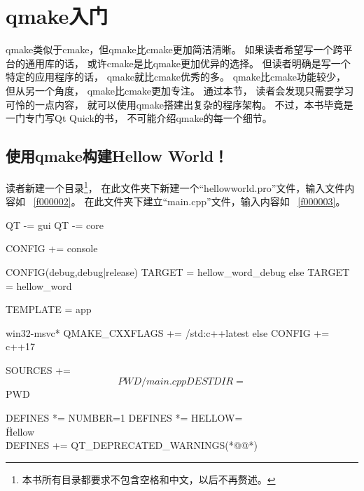 ﻿




\FloatBarrier
\section{
qmake入门
}\label{s100310}


qmake类似于cmake，但qmake比cmake更加简洁清晰。
如果读者希望写一个跨平台的通用库的话，
或许cmake是比qmake更加优异的选择。
但读者明确是写一个特定的应用程序的话，
qmake就比cmake优秀的多。
qmake比cmake功能较少，
但从另一个角度，
qmake比cmake更加专注。
通过本节，
读者会发现只需要学习可怜的一点内容，
就可以使用qmake搭建出复杂的程序架构。
不过，本书毕竟是一门专门写Qt Quick的书，
不可能介绍qmake的每一个细节。

\FloatBarrier
\subsection{
使用qmake构建Hellow World！
}\label{ss000610}

读者新建一个目录\footnote{
本书所有目录都要求不包含空格和中文，以后不再赘述。
}，
在此文件夹下新建一个“hellow\underline{\hspace{0.5em}}world.pro”文件，输入文件内容如
\filesourcenumbernameone\ \ref{f000002}。
在此文件夹下建立“main.cpp”文件，输入内容如
\filesourcenumbernameone\ \ref{f000003}。

\label{f000002}    %
\FloatBarrier                                  %
\begin{thebookfilesourceone}[escapeinside={(*@}{@*)},
caption=GoodLuck,
title=\filesourcenumbernameone \thefilesourcenumber
]
QT -= gui
QT -= core

CONFIG += console

CONFIG(debug,debug|release){
    TARGET = hellow_word_debug
}else{
    TARGET = hellow_word
}

TEMPLATE = app

win32-msvc*{
    QMAKE_CXXFLAGS += /std:c++latest
}else{
    CONFIG += c++17
}

SOURCES += $$PWD/main.cpp
DESTDIR =  $$PWD

DEFINES *= NUMBER=1
DEFINES *= HELLOW=\\\"Hellow\\\"
DEFINES += QT_DEPRECATED_WARNINGS(*@\marginpar[\hfill\setlength\fboxsep{2pt}\fbox{\footnotesize{\kaishu\parbox{1em}{\setlength{\baselineskip}{2pt}\filesourcenumbernameone}}\footnotesize{\thefilesourcenumber}}]{\setlength\fboxsep{2pt}\fbox{\footnotesize{\kaishu\parbox{1em}{\setlength{\baselineskip}{2pt}\filesourcenumbernameone}}\footnotesize{\thefilesourcenumber}}}@*)\end{thebookfilesourceone}          %
\addtocounter{lstlisting}{-1}   %

